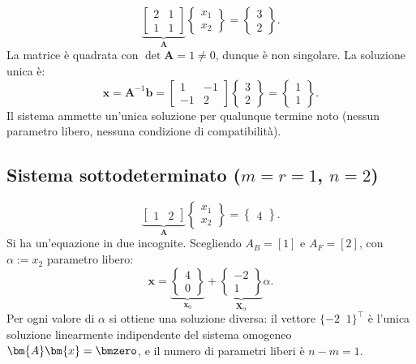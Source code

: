 \begin{equation}
	\underbrace{\begin{bmatrix} 2 & 1 \\ 1 & 1 \end{bmatrix}}_{\bm{A}}
	\begin{Bmatrix} x_1 \\ x_2 \end{Bmatrix}
	= \begin{Bmatrix} 3 \\ 2 \end{Bmatrix}.
\end{equation}
La matrice \`e quadrata con $\det\bm{A}=1 \neq 0$, dunque \`e non singolare. La soluzione unica \`e:
\begin{equation}
	\bm{x} = \bm{A}^{-1}\bm{b}
	= \begin{bmatrix} 1 & -1 \\ -1 & 2 \end{bmatrix}
	\begin{Bmatrix} 3 \\ 2 \end{Bmatrix}
	= \begin{Bmatrix} 1 \\ 1 \end{Bmatrix}.
\end{equation}
Il sistema ammette un'unica soluzione per qualunque termine noto
(nessun parametro libero, nessuna condizione di compatibilit\`a).


\subsection{Sistema sottodeterminato	(\texorpdfstring{$m=r=1$, $n=2$}{m=r=1, n=2})}

\begin{equation}
	\underbrace{\begin{bmatrix} 1 & 2 \end{bmatrix}}_{\bm{A}}
	\begin{Bmatrix} x_1 \\ x_2 \end{Bmatrix}
	= \begin{Bmatrix} 4 \end{Bmatrix}.
\end{equation}
Si ha un'equazione in due incognite. Scegliendo $A_B=[1]$ e $A_F=[2]$, con $\alpha:=x_2$ parametro libero:
\begin{equation}
	\bm{x}
	= \underbrace{\begin{Bmatrix} 4 \\ 0 \end{Bmatrix}}_{\bm{x}_0}
	+ \underbrace{\begin{Bmatrix} -2 \\ 1 \end{Bmatrix}}_{\bm{X}_\alpha} \alpha.
\end{equation}
Per ogni valore di $\alpha$ si ottiene una soluzione diversa: il vettore
$\{-2\;\;1\}^\top$ \`e l'unica soluzione linearmente indipendente del sistema
omogeneo $\bm{A}\bm{x}=\bmzero$, e il numero di parametri liberi \`e $n-m=1$.


